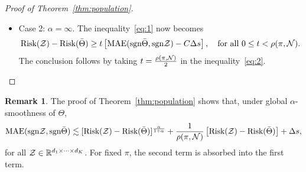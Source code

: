\documentclass[11pt]{article}
\theoremstyle{plain}
\theoremstyle{definition}
\newtheorem{rmk}{Remark}[section]
\def\sign{\textup{sgn}}
\def\risk{\textup{Risk}}
\begin{document}
\begin{proof}[Proof of Theorem~\ref{thm:population}]
\begin{itemize}[leftmargin=*,topsep=0pt,itemsep=-1ex,partopsep=1ex,parsep=1ex]
where $C(\pi)>0$ is a multiplicative factor independent of $\tZ$. 
\item Case 2: $\alpha=\infty$. The inequality~\eqref{eq:1} now becomes
\begin{equation}\label{eq:2}
\risk(\tZ)- \risk(\bar \Theta) \geq t\left[\textup{MAE}(\sign \bar\Theta, \sign \tZ)-C\Delta s\right], \quad \text{for all }0\leq t< \rho(\pi,\tN).
\end{equation}
The conclusion follows by taking $t={\rho(\pi, \mathcal{N})\over 2}$ in the inequality~\eqref{eq:2}. 
\end{itemize}
\end{proof}
\begin{rmk}\label{eq:rmk}The proof of Theorem~\ref{thm:population} shows that, under global $\alpha$-smoothness of $\Theta$, 
\begin{equation}\label{eq:remark}
\textup{MAE}(\sign \tZ,\sign \bar \Theta)  \lesssim [\risk(\tZ)- \risk(\bar \Theta)]^{\alpha\over 1+\alpha}+{1\over \rho(\pi, \tN)} \left[\risk(\tZ)- \risk(\bar \Theta)\right]+\Delta s,
\end{equation}
for all $\mathcal{Z}\in\mathbb{R}^{d_1\times \cdots \times d_K}$. For fixed $\pi$, the second term is absorbed into the first term. 
\end{rmk}
\end{document}
